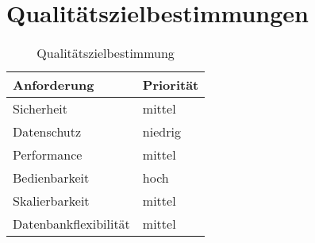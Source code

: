 \chapter{Qualitätszielbestimmungen}
\begin{table}[h]
\centering
\begin{tabular}{l|l}
Anforderung & Priorität \\ \hline
Sicherheit & mittel \\
Datenschutz & niedrig \\
Performance & mittel \\
Bedienbarkeit & hoch \\
Skalierbarkeit & mittel \\
Datenbankflexibilität & mittel
\end{tabular}
\label{tab: quality}
\caption{Qualitätszielbestimmung}
\end{table}
